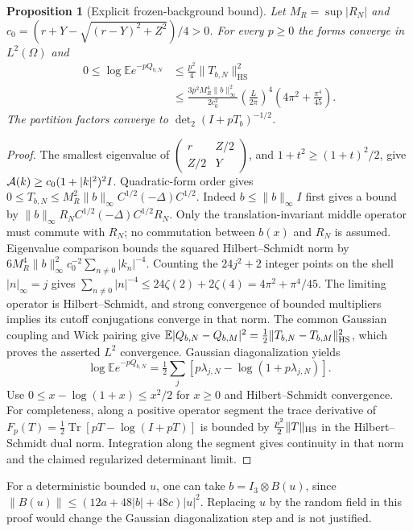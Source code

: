 \documentclass[11pt]{article}
\newtheorem{proposition}[theorem]{Proposition}
\newcommand{\E}{\mathbb E}
\newcommand{\tr}{\operatorname{Tr}}
\begin{document}
\begin{proposition}[Explicit frozen-background bound]\label{prop:det}
Let $M_R=\sup|R_N|$ and
$c_0=(r+Y-\sqrt{(r-Y)^2+Z^2})/4>0$.
For every $p\ge0$ the forms converge in $L^2(\Omega)$ and
\begin{align}\label{eq:det}
 0\le\log\E e^{-pQ_{b,N}}
 &\le\frac{p^2}{4}\|T_{b,N}\|_{\mathrm{HS}}^2\nonumber\\
 &\le\frac{3p^2M_R^4\|b\|_\infty^2}{2c_0^2}
       \left(\frac{L}{2\pi}\right)^4
       \left(4\pi^2+\frac{\pi^4}{45}\right).
\end{align}
The partition factors converge to $\det_2(I+pT_b)^{-1/2}$.
\end{proposition}
\begin{proof}
The smallest eigenvalue of
$\left(\begin{smallmatrix}r&Z/2\\Z/2&Y\end{smallmatrix}\right)$,
and $1+t^2\ge(1+t)^2/2$, give
${\cal A}(k)\ge c_0(1+|k|^2)^2I$.
Quadratic-form order gives
$0\le T_{b,N}\le M_R^2\|b\|_\infty C^{1/2}(-\Delta)C^{1/2}$.
Indeed $b\le\|b\|_\infty I$ first gives a bound by
$\|b\|_\infty R_N C^{1/2}(-\Delta)C^{1/2}R_N$.
Only the translation-invariant middle operator must commute with $R_N$;
no commutation between $b(x)$ and $R_N$ is assumed.
Eigenvalue comparison bounds the squared Hilbert--Schmidt norm by
$6M_R^4\|b\|_\infty^2c_0^{-2}\sum_{n\ne0}|k_n|^{-4}$.
Counting the $24j^2+2$ integer points on the shell $|n|_\infty=j$
gives $\sum_{n\ne0}|n|^{-4}\le24\zeta(2)+2\zeta(4)
=4\pi^2+\pi^4/45$.
The limiting operator is Hilbert--Schmidt, and strong convergence of bounded
multipliers implies its cutoff conjugations converge in that norm.
The common Gaussian coupling and Wick pairing give
$\E|Q_{b,N}-Q_{b,M}|^2=\tfrac12\|T_{b,N}-T_{b,M}\|_{\rm HS}^2$,
which proves the asserted $L^2$ convergence.
Gaussian diagonalization yields
\[
 \log\E e^{-pQ_{b,N}}=\tfrac12\sum_j
       [p\lambda_{j,N}-\log(1+p\lambda_{j,N})].
\]
Use $0\le x-\log(1+x)\le x^2/2$ for $x\ge0$ and Hilbert--Schmidt
convergence. For completeness, along a positive operator segment the
trace derivative of $F_p(T)=\tfrac12\tr[pT-\log(I+pT)]$ is bounded by
$\tfrac{p^2}{2}\|T\|_{\rm HS}$ in the Hilbert--Schmidt dual norm.
Integration along the segment gives continuity in that norm and the
claimed regularized determinant limit.
\end{proof}

For a deterministic bounded $u$, one can take $b=I_3\otimes B(u)$, since
$\|B(u)\|\le(12a+48|b|+48c)|u|^2$.
Replacing $u$ by the random field in this proof would change the Gaussian
diagonalization step and is not justified.
\end{document}
